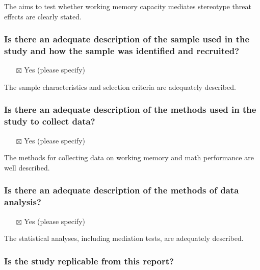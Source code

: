 \documentclass[
  doc, a4paper]{apa7}
\providecommand{\tightlist}{%
  \setlength{\itemsep}{0pt}\setlength{\parskip}{0pt}}
\begin{document}
The aims to test whether working memory capacity mediates stereotype threat effects are clearly stated.

\subsubsection{Is there an adequate description of the sample used in the study and how the sample was identified and recruited?}\label{is-there-an-adequate-description-of-the-sample-used-in-the-study-and-how-the-sample-was-identified-and-recruited}

\begin{itemize}
\tightlist
\item[$\boxtimes$]
  Yes (please specify)
\end{itemize}

The sample characteristics and selection criteria are adequately described.

\subsubsection{Is there an adequate description of the methods used in the study to collect data?}\label{is-there-an-adequate-description-of-the-methods-used-in-the-study-to-collect-data}

\begin{itemize}
\tightlist
\item[$\boxtimes$]
  Yes (please specify)
\end{itemize}

The methods for collecting data on working memory and math performance are well described.

\subsubsection{Is there an adequate description of the methods of data analysis?}\label{is-there-an-adequate-description-of-the-methods-of-data-analysis}

\begin{itemize}
\tightlist
\item[$\boxtimes$]
  Yes (please specify)
\end{itemize}

The statistical analyses, including mediation tests, are adequately described.

\subsubsection{Is the study replicable from this report?}\label{is-the-study-replicable-from-this-report}
\end{document}

